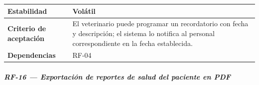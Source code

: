 \documentclass[
]{article}
\newcounter{none} %
\begin{document}
{\def\LTcaptype{none} %
\begin{longtable}[]{@{}
  >{\raggedright\arraybackslash}p{}
  >{\raggedright\arraybackslash}p{}@{}}
\toprule\noalign{}
\begin{minipage}[b]{\linewidth}\raggedright
\textbf{Estabilidad}
\end{minipage} & \begin{minipage}[b]{\linewidth}\raggedright
Volátil
\end{minipage} \\
\midrule\noalign{}
\endhead
\bottomrule\noalign{}
\endlastfoot
\textbf{Criterio de aceptación} &
\begin{minipage}[t]{\linewidth}\raggedright
El veterinario puede programar un recordatorio con fecha y descripción;
el sistema lo notifica al personal correspondiente en la fecha
establecida.
\end{minipage} \\
\textbf{Dependencias} & \begin{minipage}[t]{\linewidth}\raggedright
RF-04
\end{minipage} \\
\end{longtable}
}

\subparagraph{RF-16 --- Exportación de reportes de salud del paciente en
PDF}\label{rf-16-exportaciuxf3n-de-reportes-de-salud-del-paciente-en-pdf}
\end{document}
